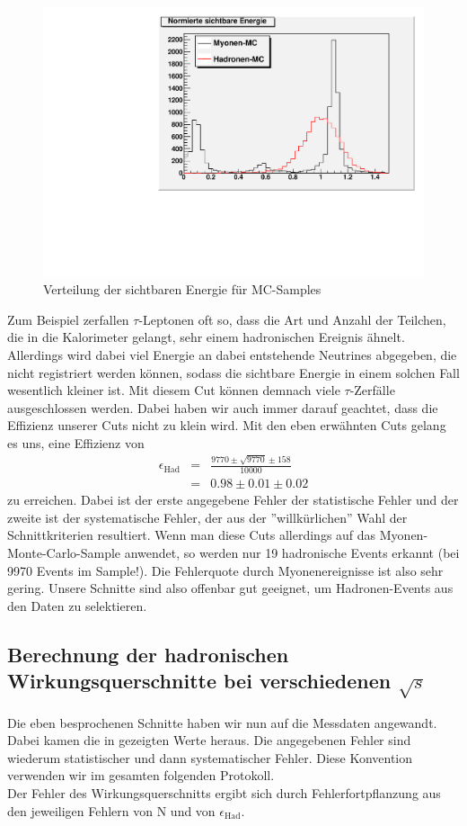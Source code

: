 \begin{figure}[htb]
	\centering
	\includegraphics[width=1\columnwidth,keepaspectratio]{Evisvgl_mc.pdf}
	\caption{Verteilung der sichtbaren Energie für MC-Samples}
	\label{fig:Evisvgl_mc}
\end{figure}
Zum Beispiel zerfallen $\tau$-Leptonen oft so, dass die Art und Anzahl der Teilchen, die in die Kalorimeter gelangt, sehr einem hadronischen Ereignis ähnelt. Allerdings wird dabei viel Energie an dabei entstehende Neutrines abgegeben, die nicht registriert werden können, sodass die sichtbare Energie in einem solchen Fall wesentlich kleiner ist. Mit diesem Cut können demnach viele $\tau$-Zerfälle ausgeschlossen werden. Dabei haben wir auch immer darauf geachtet, dass die Effizienz unserer Cuts nicht zu klein wird. Mit den eben erwähnten Cuts gelang es uns, eine Effizienz von
\begin{eqnarray}
\epsilon_\mathrm{Had} &=& \frac{9770 \pm \sqrt{9770} \pm 158}{10000}\\
&=& 0.98 \pm 0.01 \pm 0.02
\end{eqnarray}
zu erreichen. Dabei ist der erste angegebene Fehler der statistische Fehler und der zweite ist der systematische Fehler, der aus der ''willkürlichen'' Wahl der Schnittkriterien resultiert. Wenn man diese Cuts allerdings auf das Myonen-Monte-Carlo-Sample anwendet, so werden nur 19 hadronische Events erkannt (bei 9970 Events im Sample!). Die Fehlerquote durch Myonenereignisse ist also sehr gering. Unsere Schnitte sind also offenbar gut geeignet, um Hadronen-Events aus den Daten zu selektieren.

\subsection{Berechnung der hadronischen Wirkungsquerschnitte bei verschiedenen $\sqrt{s}$}
Die eben besprochenen Schnitte haben wir nun auf die Messdaten angewandt. Dabei kamen die in  gezeigten Werte heraus. Die angegebenen Fehler sind wiederum statistischer und dann systematischer Fehler. Diese Konvention verwenden wir im gesamten folgenden Protokoll.\\
Der Fehler des Wirkungsquerschnitts ergibt sich durch Fehlerfortpflanzung aus den jeweiligen Fehlern von N und von $\epsilon_\mathrm{Had}$.

